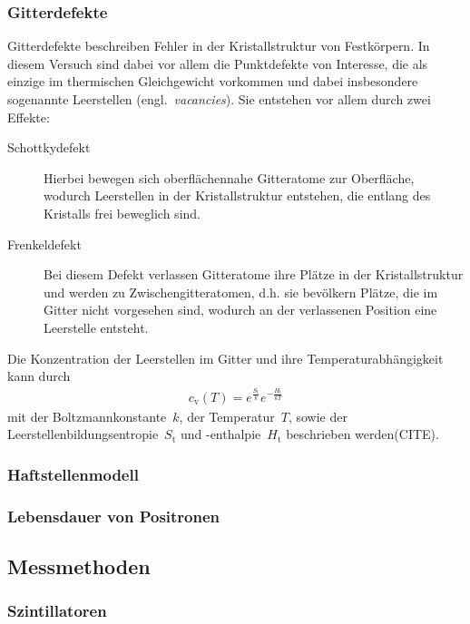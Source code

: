 \documentclass[11pt, a4paper]{article}
\numberwithin{equation}{section}
\newcommand{\korr}[1]{{\color{red}(#1)}}
\begin{document}
\subsubsection{Gitterdefekte}
Gitterdefekte beschreiben Fehler in der Kristallstruktur von Festkörpern.
In diesem Versuch sind dabei vor allem die Punktdefekte von Interesse, die als einzige im thermischen Gleichgewicht vorkommen und dabei insbesondere sogenannte Leerstellen (engl.~\textit{vacancies}).
Sie entstehen vor allem durch zwei Effekte:
\begin{description}
	\item[Schottkydefekt] Hierbei bewegen sich oberflächennahe Gitteratome zur Oberfläche, wodurch Leerstellen in der Kristallstruktur entstehen, die entlang des Kristalls frei beweglich sind.
	\item[Frenkeldefekt] Bei diesem Defekt verlassen Gitteratome ihre Plätze in der Kristallstruktur und werden zu Zwischengitteratomen, d.h. sie bevölkern Plätze, die im Gitter nicht vorgesehen sind, wodurch an der verlassenen Position eine Leerstelle entsteht.
\end{description}
Die Konzentration der Leerstellen im Gitter und ihre Temperaturabhängigkeit kann durch
\begin{align}
c_\mathrm{v}(T) = e^{\frac{S_\mathrm{t}}{k}}e^{-\frac{H_\mathrm{t}}{k T}}
\end{align}
mit der Boltzmannkonstante~$k$, der Temperatur~$T$, sowie der Leerstellenbildungsentropie~$S_\mathrm{t}$ und -enthalpie~$H_\mathrm{t}$ beschrieben werden\korr{CITE}.

\subsubsection{Haftstellenmodell}

\subsubsection{Lebensdauer von Positronen}

\subsection{Messmethoden}

\subsubsection{Szintillatoren}
\end{document}

